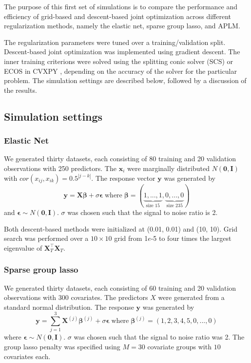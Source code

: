 \documentclass{statsoc}
\begin{document}
The purpose of this first set of simulations is to compare the performance and efficiency of grid-based and descent-based joint optimization across different regularization methods, namely the elastic net, sparse group lasso, and APLM.

The regularization parameters were tuned over a training/validation split. Descent-based joint optimization was implemented using gradient descent. The inner training criterions were solved using the splitting conic solver (SCS) or ECOS in CVXPY \citep{cvxpy}, depending on the accuracy of the solver for the particular problem. The simulation settings are described below, followed by a discussion of the results.

\subsection{Simulation settings}
\subsubsection{Elastic Net}
We generated thirty datasets, each consisting of 80 training and 20 validation observations with 250 predictors. The $\boldsymbol x_i$ were marginally distributed $N(\boldsymbol 0,\boldsymbol I)$ with $cor(x_{ij},x_{ik}) = 0.5^{|j-k|}$.
The response vector $\boldsymbol y$ was generated by
\begin{equation}
\boldsymbol y = \boldsymbol X \boldsymbol \beta + \sigma \boldsymbol \epsilon \; \text{where} \; \boldsymbol \beta = (\underbrace{1, ..., 1}_\text{size 15}, \underbrace{0, ..., 0}_\text{size 235})
\end{equation}
and $\boldsymbol \epsilon \sim N(\boldsymbol 0, \boldsymbol I)$. $\sigma$ was chosen such that the signal to noise ratio is 2. 

Both descent-based methods were initialized at (0.01, 0.01) and (10, 10). Grid search was performed over a $10 \times 10$ grid from 1$e$-5 to four times the largest eigenvalue of $\boldsymbol X_T^\top \boldsymbol X_T$.

\subsubsection{Sparse group lasso}\label{sec:simulation_sgl}
We generated thirty datasets, each consisting of 60 training and 20 validation observations with 300 covariates. The predictors $X$ were generated from a standard normal distribution. The response $\boldsymbol y$ was generated by
\begin{equation}
\boldsymbol y = \sum\limits_{j=1}^3 \boldsymbol X^{(j)} \boldsymbol \beta^{(j)} + \sigma \boldsymbol \epsilon \; \text{where} \; \boldsymbol \beta^{(j)} = (1, 2, 3, 4, 5, 0, ..., 0)
\end{equation}
where $\boldsymbol \epsilon \sim N(\boldsymbol 0, \boldsymbol I)$. $\sigma$ was chosen such that the signal to noise ratio was 2. The group lasso penalty was specified using $M=30$ covariate groups with $10$ covariates each.
\end{document}
